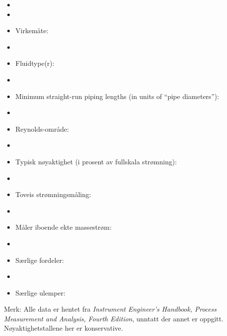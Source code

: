\begin{itemize}
\goodbreak
\item{} 
\vskip 5pt
\item\item{} Virkemåte:
\vskip 5pt
\item\item{} Fluidtype(r):
\vskip 5pt
\item\item{} Minimum straight-run piping lengths (in units of ``pipe diameters''):
\vskip 5pt
\item\item{} Reynolds-område:
\vskip 5pt
\item\item{} Typisk nøyaktighet (i prosent av fullskala strømning):
\vskip 5pt
\item\item{} Toveis strømningsmåling:
\vskip 5pt
\item\item{} Måler iboende ekte massestrøm:
\vskip 5pt
\item\item{} Særlige fordeler:
\vskip 5pt
\item\item{} Særlige ulemper:
\end{itemize}







Merk: Alle data er hentet fra {\it Instrument Engineer's Handbook, Process Measurement and Analysis, Fourth Edition}, unntatt der annet er oppgitt. Nøyaktighetstallene her er konservative.

